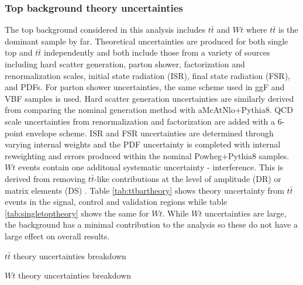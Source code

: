 \subsubsection{Top background theory uncertainties}
The top background considered in this analysis includes $t\bar{t}$ and $Wt$ where $t\bar{t}$ is the dominant sample by far. Theoretical uncertainties are produced for both single top and $t\bar{t}$ independently and both include those from a variety of sources including hard scatter generation, parton shower, factorization and renormalization scales, initial state radiation (ISR), final state radiation (FSR), and PDFs. For parton shower uncertainties, the same scheme used in ggF and VBF samples is used. Hard scatter generation uncertainties are similarly derived from comparing the nominal generation method with aMcAtNlo$+$Pythia8. QCD scale uncertainties from renormalization and factorization are added with a 6-point envelope scheme. ISR and FSR uncertainties are determined through varying internal weights and the PDF uncertainty is completed with internal reweighting and errors produced within the nominal Powheg$+$Pythia8 samples. $Wt$ events contain one additonal systematic uncertainty - interference. This is derived from removing $t\bar{t}$-like contributions at the level of amplitude (DR) or matrix elements (DS) \cite{Wttheory}. Table \ref{tab:ttbartheory} shows theory uncertainty from $t\bar{t}$ events in the signal, control and validation regions while table \ref{tab:singletoptheory} shows the same for $Wt$. While $Wt$ uncertainties are large, the background has a minimal contribution to the analysis so these do not have a large effect on overall results.

\begin{table}[h!]
\scalebox{0.6}{

}
\caption{$t\bar{t}$ theory uncertainties breakdown}
\label{tab:ttbartheory}
\end{table}

\begin{table}[h!]
\scalebox{0.6}{

}
\caption{$Wt$ theory uncertainties breakdown}
\label{tab:singletoptheory}
\end{table}

